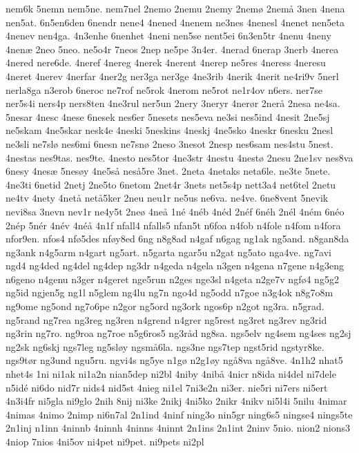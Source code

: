 nem6k
5nemn
nem5ne.
nem7nel
2nemo
2nemu
2nemy
2nem^^f8
2nem^^e5
3nen
4nena
nen5at.
6n5en6den
6nendr
nene4
4nened
4nenem
ne3nes
4nenesl
4nenet
nen5eta
4nenev
nen4ga.
4n3enhe
6nenhet
4neni
nen5se
nent5ei
6n3en5tr
4nenu
4neny
4nen^^e6
2neo
5neo.
ne5o4r
7neos
2nep
ne5pe
3n4er.
4nerad
6nerap
3nerb
4nerea
4nered
nere6de.
4neref
4nereg
4nerek
4nerent
4nerep
ne5res
4neress
4neresu
4neret
4nerev
4nerfar
4ner2g
ner3ga
ner3ge
4ne3rib
4nerik
4nerit
ne4ri9v
5nerl
nerla8ga
n3erob
6neroc
ne7rof
ne5rok
4nerom
ne5rot
ne1r4ov
n6ers.
ner7se
ner5s4i
ners4p
ners8ten
4ne3rul
ner5un
2nery
3neryr
4ner^^f8r
2ner^^e5
2nesa
ne4sa.
5nesar
4nesc
4nese
6nesek
nes6er
5nesets
nes5eva
ne3si
nes5ind
4nesit
2ne5sj
ne5skam
4ne5skar
nesk4e
4neski
5neskins
4neskj
4ne5sko
4neskr
6nesku
2nesl
ne3sli
ne7sl^^f8
nes6mi
6nesn
ne7sn^^f8
2neso
3nesot
2nesp
nes6sam
nes4stu
5nest.
4nestas
nes9tas.
nes9te.
4nesto
nes5tor
4ne3str
4nestu
4nest^^f8
2nesu
2ne1sv
nes8va
6nesy
4nes^^e6
5nes^^f8y
4ne5s^^e5
nes^^e55re
3net.
2neta
4netaks
neta6le.
ne3te
5nete.
4ne3ti
6netid
2netj
2ne5to
6netom
2net4r
3nets
net5s4p
nett3a4
net6tel
2netu
ne4tv
4nety
4net^^e5
net^^e55ker
2neu
neu1r
ne5us
ne6va.
ne4ve.
6ne8vent
5nevik
nevi8sa
3nevn
nev1r
ne4y5t
2ne^^f8
4ne^^e5
1n^^e9
4n^^e9b
4n^^e9d
2n^^e9f
6n^^e9h
2n^^e9l
4n^^e9m
6n^^e9o
2n^^e9p
5n^^e9r
4n^^e9v
4n^^e9^^e5
4n1f
nfall4
nfalls5
nfan5t
n6foa
n4fob
n4fole
n4fom
n4fora
nfor9en.
nfos4
nf^^f85des
nf^^f8y8ed
6ng
n8g8ad
n4gaf
n6gag
ng1ak
ng5and.
n8gan8da
ng3ank
n4g5arm
n4gart
ng5art.
n5garta
ngar5u
n2gat
ng5ato
nga4ve.
ng7avi
ngd4
ng4ded
ng4del
ng4dep
ng3dr
n4geda
n4gela
n3gen
n4gena
n7gene
n4g3eng
n6geno
n4genu
n3ger
n4geret
nge5run
n2ges
nge3sl
n4geta
n2ge7v
ngf^^f84
ng5g2
ng5id
ngjen5g
ng1l
n5glem
ng4lu
ng7n
ngo4d
ng5odd
n7goe
n3g4ok
n8g7o8m
ng9ome
ng5ond
ng7o6pe
n2gor
ng5ord
ng3ork
ngos6p
n2got
ng3ra.
n5grad.
ng5rand
ng7rea
ng3reg
ng3ren
n4grend
n4grer
ng5rest
ng3ret
ng3rev
ng3rid
ng3rin
ng7ro.
ng9roa
ng7roe
n5g6ros5
ng3r^^e5d
ng8sa.
ngs5elv
ng4sem
ng4ses
ng2sj
ng2sk
ng6skj
ngs7leg
ng5sl^^f8y
ngsm^^e56la.
ngs3ne
ngs7tep
ngst5rid
ngstyr8ke.
ngs9t^^f8r
ng3und
ngu5ru.
ngvi4s
ng5ye
n1g^^f8
n2g1^^f8y
ng^^e58va
ng^^e58ve.
4n1h2
nhat5
nhet4s
1ni
ni1ak
ni1a2n
nian5dep
ni2bl
4niby
4nib^^e5
4nicr
n8ida
ni4del
ni7dele
n5id^^e9
ni6do
nid7r
nids4
nid5st
4nieg
ni1el
7ni3e2n
ni3er.
nie5ri
ni7ers
ni5ert
4n3i4fr
ni5gla
ni9glo
2nih
8nij
ni3ke
2nikj
4ni5ko
2nikr
4nikv
ni5l4i
5nilu
4nimar
4nimas
4nimo
2nimp
ni6n7al
2n1ind
4ninf
ning3o
nin5gr
ning6s5
ningse4
nings5te
2n1inj
n1inn
4ninnb
4ninnh
4ninns
4ninnt
2n1ins
2n1int
2ninv
5nio.
nion2
nions3
4niop
7nios
4ni5ov
ni4pet
ni9pet.
ni9pets
ni2pl
